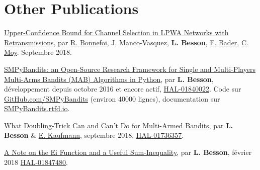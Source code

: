 \section*{Other Publications}
\renewcommand{\labelenumi}{[OP-\arabic{enumi}]}
\begin{etaremune}
\item
	\href{https://perso.crans.org/besson/articles/BMBBM__IEEE_WCNC__2019.pdf}{Upper-Confidence
	Bound for Channel Selection in LPWA Networks with Retransmissions},
	par \href{https://remibonnefoi.wordpress.com/}{R. Bonnefoi}, J.
	Manco-Vasquez, \textbf{L. Besson},
	\href{https://cfaouzi-bader.com/}{F. Bader},
	\href{https://moychris.wordpress.com/}{C. Moy}. Septembre 2018.
\item
	\href{https://hal.inria.fr/hal-01840022/document}{SMPyBandits: an
	Open-Source Research Framework for Single and Multi-Players Multi-Arms
	Bandits (MAB) Algorithms in Python}, par \textbf{L. Besson},
	développement depuis octobre 2016 et encore actif,
	\href{https://hal.inria.fr/hal-01840022}{HAL-01840022}. Code sur
	\href{https://GitHub.com/SMPyBandits/SMPyBandits}{GitHub.com/SMPyBandits}
	(environ 40000 lignes), documentation sur
	\href{https://SMPyBandits.rtfd.io}{SMPyBandits.rtfd.io}.
\item
	\href{https://hal.inria.fr/hal-01736357/document}{What Doubling-Trick
	Can and Can't Do for Multi-Armed Bandits}, par \textbf{L. Besson} \&
	\href{http://chercheurs.lille.inria.fr/ekaufman/research.html}{E.
	Kaufmann}, septembre 2018,
	\href{https://hal.inria.fr/hal-01736357}{HAL-01736357}.
\item
	\href{https://hal.inria.fr/hal-01847480/document}{A Note on the Ei
	Function and a Useful Sum-Inequality}, par \textbf{L. Besson}, février
	2018 \href{https://hal.inria.fr/hal-01847480}{HAL-01847480}.
\end{etaremune}


